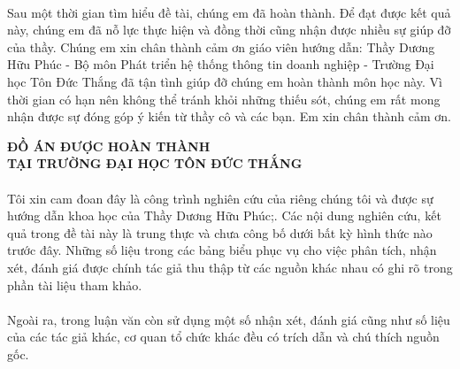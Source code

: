 \documentclass{report}
\begin{document}
	\paragraph{}
	Sau một thời gian tìm hiểu đề tài, chúng em đã hoàn thành. Để đạt được kết quả này, chúng em đã nỗ lực thực hiện và đồng thời cũng nhận được nhiều sự giúp đỡ của thầy. Chúng em xin chân thành cảm ơn giáo viên hướng dẫn: Thầy Dương Hữu Phúc - Bộ môn Phát triển hệ thống thông tin doanh nghiệp - Trường Đại học Tôn Đức Thắng đã tận tình giúp đỡ chúng em hoàn thành môn học này. Vì thời gian có hạn nên không thể tránh khỏi những  thiếu  sót,  chúng em  rất mong nhận được sự đóng góp ý kiến từ thầy cô và các bạn. Em xin chân thành cảm ơn.

\pagebreak	
\begin{center}
	\fontsize{16}{20}\selectfont
	\textbf{ĐỒ ÁN ĐƯỢC HOÀN THÀNH}\\
	\textbf{TẠI TRƯỜNG ĐẠI HỌC TÔN ĐỨC THẮNG\\} 
\end{center}
\fontsize{13}{15}\selectfont
\paragraph{}
Tôi xin cam đoan đây là công trình nghiên cứu của riêng chúng tôi và được sự hướng dẫn khoa học của Thầy Dương Hữu Phúc;. Các nội dung nghiên cứu, kết quả trong đề tài này là trung thực và chưa công bố dưới bất kỳ hình thức nào trước đây. Những số liệu trong các bảng biểu phục vụ cho việc phân tích, nhận xét, đánh giá được chính tác giả thu thập từ các nguồn khác nhau có ghi rõ trong phần tài liệu tham khảo.
\paragraph{}
Ngoài ra, trong luận văn còn sử dụng một số nhận xét, đánh giá cũng như số liệu của các tác giả khác, cơ quan tổ chức khác đều có trích dẫn và chú thích nguồn gốc.
\end{document}
